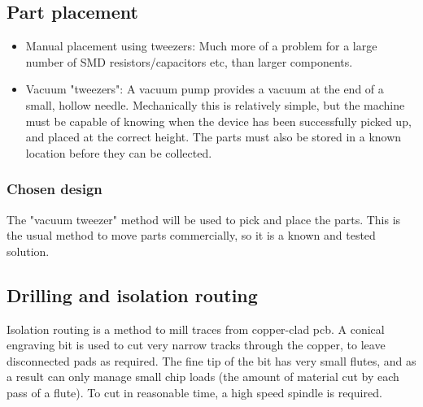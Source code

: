 \subsection{Part placement}

\begin{itemize}
	\item	Manual placement using tweezers: Much more of a problem for a large number of SMD resistors/capacitors etc, than
		larger components. 
	\item	Vacuum "tweezers": A vacuum pump provides a vacuum at the end of a small, hollow needle. Mechanically this is relatively simple, but the machine must be capable
			of knowing when the device has been successfully picked up, and placed at the correct height. The parts must also be stored in a known location before they can be
			collected.
\end{itemize}

\subsubsection{Chosen design}
The "vacuum tweezer" method will be used to pick and place the parts. This is the usual method to move parts commercially, so it is a known and tested solution.



\subsection{Drilling and isolation routing}
Isolation routing is a method to mill traces from copper-clad pcb. A conical engraving bit is used to cut very narrow tracks through
the copper, to leave disconnected pads as required. The fine tip of the bit has very small flutes, and as a result can only manage
small chip loads (the amount of material cut by each pass of a flute). To cut in reasonable time, a high speed spindle is required.

